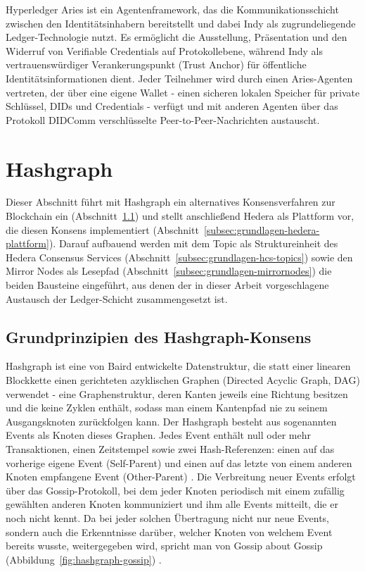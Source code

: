 Hyperledger Aries ist ein Agentenframework, das die Kommunikationsschicht zwischen den Identitätsinhabern bereitstellt und dabei Indy als zugrundeliegende Ledger-Technologie nutzt. Es ermöglicht die Ausstellung, Präsentation und den Widerruf von Verifiable Credentials auf Protokollebene, während Indy als vertrauenswürdiger Verankerungspunkt (Trust Anchor) für öffentliche Identitätsinformationen dient. Jeder Teilnehmer wird durch einen Aries-Agenten vertreten, der über eine eigene Wallet - einen sicheren lokalen Speicher für private Schlüssel, DIDs und Credentials - verfügt und mit anderen Agenten über das Protokoll DIDComm verschlüsselte Peer-to-Peer-Nachrichten austauscht. \cite{mazzocca2025}

\section{Hashgraph}
\label{sec:grundlagen-hashgraph}
Dieser Abschnitt führt mit Hashgraph ein alternatives Konsensverfahren zur Blockchain ein (Abschnitt~\ref{subsec:grundlagen-hashgraph-konsens}) und stellt anschließend Hedera als Plattform vor, die diesen Konsens implementiert (Abschnitt~\ref{subsec:grundlagen-hedera-plattform}). Darauf aufbauend werden mit dem Topic als Struktureinheit des Hedera Consensus Services (Abschnitt~\ref{subsec:grundlagen-hcs-topics}) sowie den Mirror Nodes als Lesepfad (Abschnitt~\ref{subsec:grundlagen-mirrornodes}) die beiden Bausteine eingeführt, aus denen der in dieser Arbeit vorgeschlagene Austausch der Ledger-Schicht zusammengesetzt ist.

\subsection{Grundprinzipien des Hashgraph-Konsens}
\label{subsec:grundlagen-hashgraph-konsens}
Hashgraph ist eine von Baird \cite{baird2016} entwickelte Datenstruktur, die statt einer linearen Blockkette einen gerichteten azyklischen Graphen (Directed Acyclic Graph, DAG) verwendet - eine Graphenstruktur, deren Kanten jeweils eine Richtung besitzen und die keine Zyklen enthält, sodass man einem Kantenpfad nie zu seinem Ausgangsknoten zurückfolgen kann. Der Hashgraph besteht aus sogenannten Events als Knoten dieses Graphen. Jedes Event enthält null oder mehr Transaktionen, einen Zeitstempel sowie zwei Hash-Referenzen: einen auf das vorherige eigene Event (Self-Parent) und einen auf das letzte von einem anderen Knoten empfangene Event (Other-Parent) \cite{akhtar2019}. Die Verbreitung neuer Events erfolgt über das Gossip-Protokoll, bei dem jeder Knoten periodisch mit einem zufällig gewählten anderen Knoten kommuniziert und ihm alle Events mitteilt, die er noch nicht kennt. Da bei jeder solchen Übertragung nicht nur neue Events, sondern auch die Erkenntnisse darüber, welcher Knoten von welchem Event bereits wusste, weitergegeben wird, spricht man von Gossip about Gossip (Abbildung~\ref{fig:hashgraph-gossip}) \cite{baird2016}.

